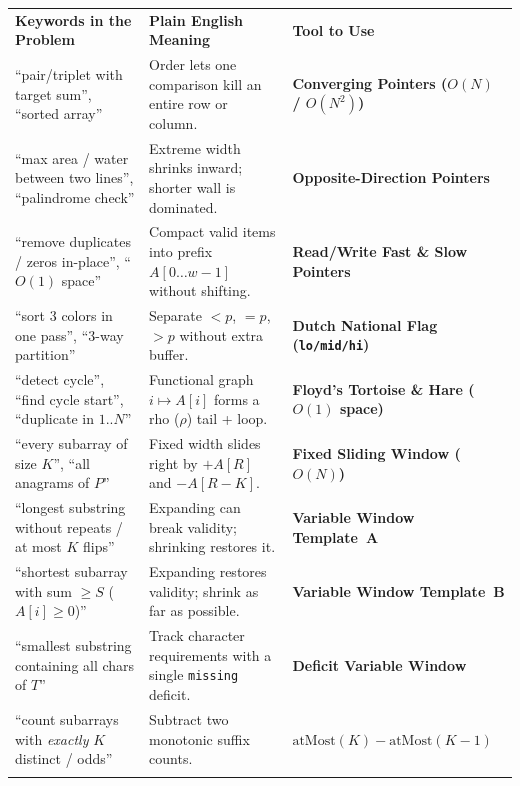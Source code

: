 \documentclass[11pt,a4paper]{article}
\theoremstyle{definition}
\begin{document}
\begingroup\small{}
\begin{tabularx}{\textwidth}{>{\raggedright\arraybackslash}p{4.3cm} >{\raggedright\arraybackslash}X >{\raggedright\arraybackslash\bfseries}p{4.1cm}}
\arrayrulecolor{primaryblue}\toprule[1.2pt]
\rowcolor{primaryblue!10}
\textcolor{primaryblue}{\textbf{Keywords in the Problem}} & \textcolor{primaryblue}{\textbf{Plain English Meaning}} & \textcolor{primaryblue}{\textbf{Tool to Use}} \\
\arrayrulecolor{codeframe}\midrule[0.6pt]
``pair/triplet with target sum'', ``sorted array'' & Order lets one comparison kill an entire row or column. & Converging Pointers ($O(N)$ / $O(N^2)$) \\
``max area / water between two lines'', ``palindrome check'' & Extreme width shrinks inward; shorter wall is dominated. & Opposite-Direction Pointers \\
``remove duplicates / zeros in-place'', ``$O(1)$ space'' & Compact valid items into prefix $A[0 \dots w-1]$ without shifting. & Read/Write Fast \& Slow Pointers \\
``sort 3 colors in one pass'', ``3-way partition'' & Separate $<p$, $=p$, $>p$ without extra buffer. & Dutch National Flag (\texttt{lo/mid/hi}) \\
``detect cycle'', ``find cycle start'', ``duplicate in $1..N$'' & Functional graph $i \mapsto A[i]$ forms a rho ($\rho$) tail + loop. & Floyd's Tortoise \& Hare ($O(1)$ space) \\
``every subarray of size $K$'', ``all anagrams of $P$'' & Fixed width slides right by $+A[R]$ and $-A[R-K]$. & Fixed Sliding Window ($O(N)$) \\
``longest substring without repeats / at most $K$ flips'' & Expanding can break validity; shrinking restores it. & Variable Window Template~A \\
``shortest subarray with sum $\ge S$ ($A[i] \ge 0$)'' & Expanding restores validity; shrink as far as possible. & Variable Window Template~B \\
``smallest substring containing all chars of $T$'' & Track character requirements with a single \texttt{missing} deficit. & Deficit Variable Window \\
``count subarrays with \emph{exactly} $K$ distinct / odds'' & Subtract two monotonic suffix counts. & $\text{atMost}(K) - \text{atMost}(K{-}1)$ \\
\arrayrulecolor{primaryblue}\bottomrule[1.2pt]
\end{tabularx}\endgroup
\end{document}
